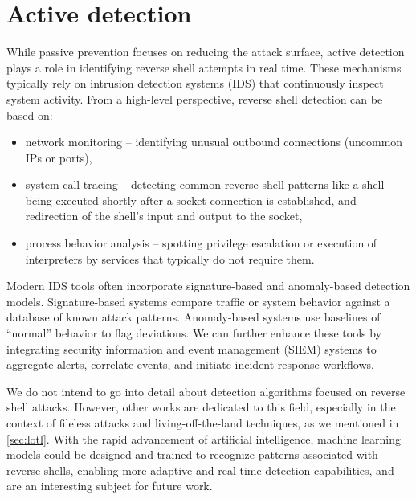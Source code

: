 \section{Active detection}
\label{sec:active-detection}

While passive prevention focuses on reducing the attack surface, active detection plays a role in identifying reverse shell attempts in real time. These mechanisms typically rely on intrusion detection systems (IDS) that continuously inspect system activity. From a high-level perspective, reverse shell detection can be based on:

\begin{itemize}

\item network monitoring -- identifying unusual outbound connections (uncommon IPs or ports),

\item system call tracing -- detecting common reverse shell patterns like a shell being executed shortly after a socket connection is established, and redirection of the shell's input and output to the socket,

\item process behavior analysis -- spotting privilege escalation or execution of interpreters by services that typically do not require them.

\end{itemize}

Modern IDS tools often incorporate signature-based and anomaly-based detection models. Signature-based systems compare traffic or system behavior against a database of known attack patterns. Anomaly-based systems use baselines of ``normal'' behavior to flag deviations. We can further enhance these tools by integrating security information and event management (SIEM) systems to aggregate alerts, correlate events, and initiate incident response workflows.

We do not intend to go into detail about detection algorithms focused on reverse shell attacks. However, other works are dedicated to this field, especially in the context of fileless attacks and living-off-the-land techniques, as we mentioned in \cref{sec:lotl}. With the rapid advancement of artificial intelligence, machine learning models could be designed and trained to recognize patterns associated with reverse shells, enabling more adaptive and real-time detection capabilities, and are an interesting subject for future work.